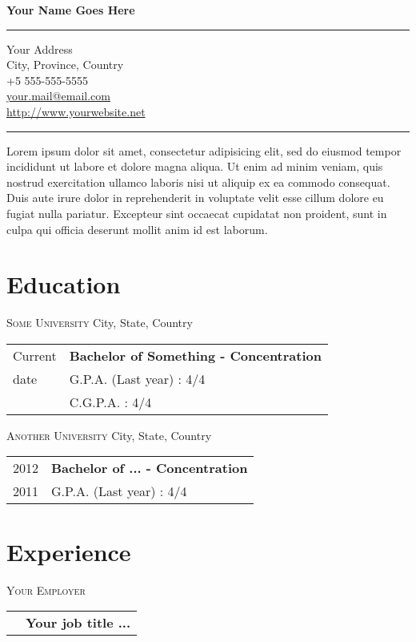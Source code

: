 \documentclass[10pt, letterpaper]{article}
\def\COL{2.1}
\begin{document}
\begin{center}
  \textbf{Your Name Goes Here}
  \rule{\textwidth}{0.4mm}
  Your Address \\
  City, Province, Country  \\
  +5 555-555-5555 \\
  \href{mailto:your.mail@email.com}{your.mail@email.com} \\
  \url{http://www.yourwebsite.net}
  \rule{\textwidth}{0.4mm}
\end{center}

\noindent Lorem ipsum dolor sit amet, consectetur adipisicing elit, sed do eiusmod tempor incididunt ut labore et dolore magna aliqua. Ut enim ad minim veniam, quis nostrud exercitation ullamco laboris nisi ut aliquip ex ea commodo consequat. Duis aute irure dolor in reprehenderit in voluptate velit esse cillum dolore eu fugiat nulla pariatur. Excepteur sint occaecat cupidatat non proident, sunt in culpa qui officia deserunt mollit anim id est laborum.

\section*{Education}
\noindent\enskip\textsc{Some University} \hfill City, State, Country
\medskip

\begin{tabular}{p{\COL cm}|l}
  {\hfill Current} & \textbf{Bachelor of Something - Concentration} \\
  {\hfill    date} & G.P.A. (Last year) : 4/4 \\
  {\hfill        } & C.G.P.A. : 4/4
\end{tabular}
\medskip

\noindent\enskip\textsc{Another University} \hfill City, State, Country
\medskip

\begin{tabular}{p{\COL cm}|l} 
  {\hfill 2012} & \textbf{Bachelor of ... - Concentration} \\
  {\hfill 2011} & G.P.A. (Last year) : 4/4
\end{tabular}
\medskip

\section*{Experience}
\noindent\enskip\textsc{Your Employer}
\medskip

\begin{tabular}{p{\COL cm} l} 
  {\hfill} & \textbf{Your job title ...}
\end{tabular}
\end{document}
